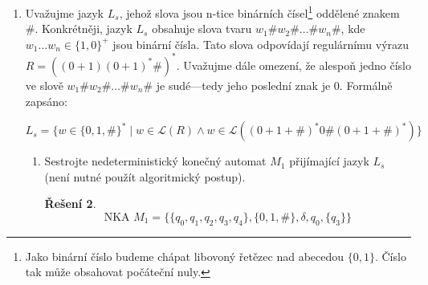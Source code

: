 \documentclass[11pt, a4paper]{article}
\theoremstyle{result}
\newtheorem*{result}{Řešení}
\begin{document}
\begin{enumerate}
\begin{result}
\begin{itemize}
            \begin{proof}
            Předpokládejme, že $L_1 \in \mathcal{L}_3$. Potom z pumping lemmatu plyne, že $\exists k > 0: \forall w \in L_1: |w| \ge k \Rightarrow \exists x, y, z \in \{a, b, c\}^*: w = xyz \land y \neq \varepsilon \land |xy| \leq k \land \forall i \geq 0: xy^iz \in L_1$. Uvažme libovolné $k$ splňující výše uvedenou podmínku. Zvolme slovo $w = a^{k + 1}b^k \in L_1$. Zřejmě $|w| = 2k + 1 \ge k$. Uvažme libovolné $x, y, z \in \{a, b, c\}^*$ takové, že $w = a^{k + 1}b^k = xyz \land y \neq \varepsilon \land |xy| \leq k \land \forall i \ge 0: xy^iz \in L_1$. Je zřejmé, že $y = a^l$, kde $1 \le l \le k$. Pak ale pro $i = 0$ platí, že $xy^0z \notin L_1$, jelikož $\#_a(xy^0z) \le \#_b(xy^0z)$. To je ve sporu s pumping lemmatem pro regulární jazyky a počáteční předpoklad je tedy vyvrácen. Z toho důvodu $L_1 \notin \mathcal{L}_3$.
            
            Alternativně lze vyjít z uzávěrových vlastností třídy regulárních jazyků. Víme, že $\mathcal{L}_3$ je uzavřena na doplněk. Zřejmě $L_2 = \textit{co--}L_1$. Jelikož však $\textit{co--}L_1 \notin \mathcal{L}_3$, pak také $L_1 \notin \mathcal{L}_3$.
            \end{proof}
        \end{itemize}
    \end{result}
    
    \item
    Uvažujme jazyk $L_s$, jehož slova jsou n-tice binárních čísel\footnote{Jako binární číslo budeme chápat libovoný řetězec nad abecedou $\{0, 1\}$. Číslo tak může obsahovat počáteční nuly.} oddělené znakem $\#$. Konkrétněji, jazyk $L_s$ obsahuje slova tvaru $w_1\#w_2\#\dots\#w_n\#$, kde $w_1\dots w_n \in \{1, 0\}^+$ jsou binární čísla. Tato slova odpovídají regulárnímu výrazu $R = ((0 + 1)(0 + 1)^*\#)^*$. Uvažujme dále omezení, že alespoň jedno číslo ve slově
    $w_1\#w_2\#\dots\#w_n\#$ je sudé---tedy jeho poslední znak je $0$. Formálně zapsáno:
    
    $$L_s = \{w \in \{0, 1, \#\}^* \mid w \in \mathcal{L}(R) \land w \in \mathcal{L}((0 + 1 + \#)^*0\#(0 + 1 + \#)^*)\}$$
    
    \begin{enumerate}
        \item
        Sestrojte nedeterministický konečný automat $M_1$ přijímající jazyk $L_s$ (není nutné použít algoritmický postup).
        
        \begin{result}
            $$\text{NKA } M_1 = \{\{q_0, q_1, q_2, q_3, q_4\}, \{0, 1, \#\}, \delta, q_0, \{q_3\}\}$$
            

\end{result}
\end{enumerate}
\end{enumerate}
\end{document}
